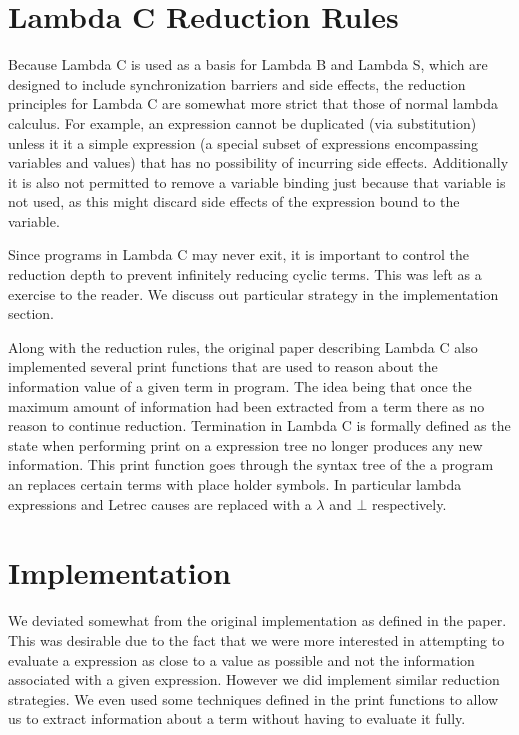 \documentclass[preprint]{sigplanconf}
\begin{document}
\section{Lambda C Reduction Rules}
Because Lambda C is used as a basis for Lambda B and Lambda S, which are designed to include synchronization barriers and side effects, the reduction principles for Lambda C are somewhat more strict that those of normal lambda calculus.  For example, an expression cannot be duplicated (via substitution) unless it it a simple expression (a special subset of expressions encompassing variables and values)  that has no possibility of incurring side effects.  Additionally it is also not permitted to remove a variable binding just because that variable is not used, as this might discard side effects of the expression bound to the variable.

Since programs in Lambda C may never exit, it is important to control the reduction depth to prevent infinitely reducing cyclic terms. This was left as a exercise to the reader. We discuss out particular strategy in the implementation section.

Along with the reduction rules, the original paper describing Lambda C also implemented several print functions that are used to reason about the information value of a given term in program. The idea being that once the maximum amount of information had been extracted from a term there as no reason to continue reduction. Termination in Lambda C is formally defined as the state when performing print on a expression tree no longer produces any new information.  This print function goes through the syntax tree of the a program an replaces certain terms with place holder symbols. In particular lambda expressions and Letrec causes are replaced with a $\lambda$ and $\bot$ respectively.

\section{Implementation}
We deviated somewhat from the original implementation as defined in the paper. This was desirable due to the fact that we were more interested in attempting to evaluate a expression as close to a value as possible and not the information associated with a given expression. However we did implement similar reduction strategies. We even used some techniques defined in the print functions to allow us to extract information about a term without having to evaluate it fully. 
\end{document}
